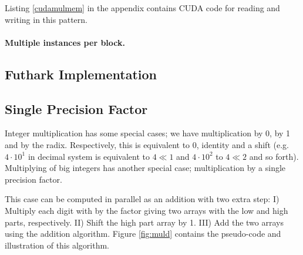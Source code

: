 Listing \ref{cudamulmem} in the appendix contains CUDA code for reading and
writing in this pattern.

\paragraph{Multiple instances per block.}


\subsection{Futhark Implementation}
\label{subsec:mulfut}


\subsection{Single Precision Factor}
\label{subsec:mulsin}

Integer multiplication has some special cases; we have multiplication by 0, by 1
and by the radix. Respectively, this is equivalent to 0, identity and a shift
(e.g. $4 \cdot 10^1$ in decimal system is equivalent to $4 \ll 1$ and
$4\cdot 10^2$ to $4\ll 2$ and so forth). Multiplying of big integers has another
special case; multiplication by a single precision factor.

This case can be computed in parallel as an addition with two extra step: I)
Multiply each digit with by the factor giving two arrays with the low and high
parts, respectively. II) Shift the high part array by 1. III) Add the two arrays
using the addition algorithm. Figure \ref{fig:muld} contains the pseudo-code and
illustration of this algorithm.

